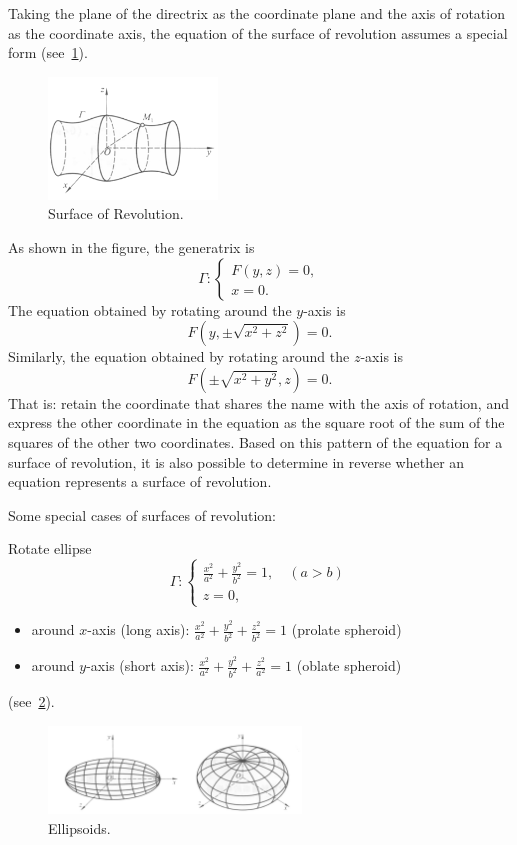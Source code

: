 \documentclass[11pt]{../../TexTemplate/elegantbook} %
\begin{document}
Taking the plane of the directrix as the coordinate plane and the axis of rotation as the coordinate axis, 
the equation of the surface of revolution assumes a special form (see~\ref{fig:SurfaceOfRevolution}).
\begin{figure}[h]
    \centering
    \includegraphics[width=0.4\textwidth]{img/Revolution.png}
    \caption{Surface of Revolution.}
    \label{fig:SurfaceOfRevolution}
\end{figure}
As shown in the figure, the generatrix is
\[
\Gamma: \begin{cases} F(y,z)=0, \\ x = 0. \end{cases}
\]
The equation obtained by rotating around the \(y\)-axis is
\[
F(y, \pm \sqrt{x^{2}+z^{2}}) = 0.
\]
Similarly, the equation obtained by rotating around the \(z\)-axis is 
\[
F(\pm \sqrt{x^{2}+y^{2}}, z) = 0.
\]
That is: retain the coordinate that shares the name with the axis of rotation, 
and express the other coordinate in the equation as the square root of the sum of the squares of the other two coordinates. 
Based on this pattern of the equation for a surface of revolution, 
it is also possible to determine in reverse whether an equation represents a surface of revolution.

\vspace{0.7cm}
Some special cases of surfaces of revolution:

\noindent Rotate ellipse
\[
\Gamma: \begin{cases} \frac{x^{2}}{a^{2}} + \frac{y^{2}}{b^{2}} = 1,\quad(a>b) \\ z = 0, \end{cases}
\]
\begin{itemize}
    \item around \(x\)-axis (long axis): \( \frac{x^{2}}{a^{2}} + \frac{y^{2}}{b^{2}} + \frac{z^{2}}{b^{2}} = 1\) (prolate spheroid) 
    \item around \(y\)-axis (short axis): \( \frac{x^{2}}{a^{2}} + \frac{y^{2}}{b^{2}} + \frac{z^{2}}{a^{2}} = 1\) (oblate spheroid)
\end{itemize}
(see~\ref{fig:Ellipsoids}).
\begin{figure}[h]
    \centering
    \includegraphics[width=0.6\textwidth]{img/ellipse.png}
    \caption{Ellipsoids.}
    \label{fig:Ellipsoids}
\end{figure}
\end{document}

